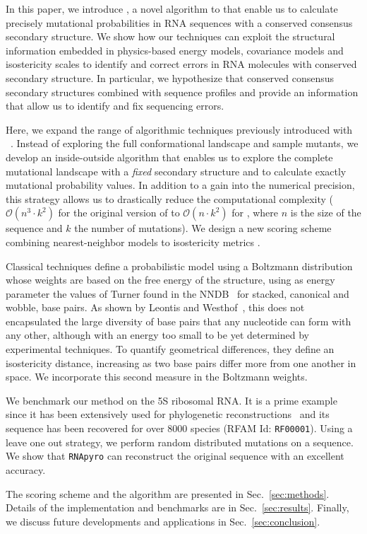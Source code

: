 In this paper, we introduce \RNApyro, a novel algorithm to that enable us to calculate precisely mutational probabilities in RNA sequences with a
conserved consensus secondary structure. We show how our techniques can exploit the structural information embedded in physics-based energy models, 
covariance models and isostericity scales to identify and correct errors in RNA molecules with conserved secondary structure. In particular, we hypothesize that 
conserved consensus secondary structures combined with sequence profiles and provide an information that allow us to identify and fix sequencing errors.

Here, we expand the range of algorithmic techniques previously introduced with \RNAmutants~\cite{Waldispuhl2008}.
Instead of exploring the full conformational landscape and sample mutants, we develop an inside-outside algorithm that enables us
to explore the complete mutational landscape with a \emph{fixed} secondary structure and to calculate exactly mutational probability values. In addition
to a gain into the numerical precision, this strategy allows us to drastically reduce the computational complexity ($\mathcal{O}(n^3 \cdot k^2)$ for the
original version of  \RNAmutants to $\mathcal{O}(n \cdot k^2)$ for \RNApyro, where $n$ is the size of the sequence and $k$ the number of mutations).
We design a new scoring scheme combining nearest-neighbor models \cite{Turner2010} to isostericity metrics \cite{Stombaugh2009}.

Classical techniques define a probabilistic model using a Boltzmann distribution 
whose weights are based on the free energy of the structure, using as energy parameter
the values of Turner found in the NNDB~\cite{Turner2010}  for stacked, 
canonical and wobble, base pairs. As shown by Leontis and Westhof~\cite{Leontis2001},
this  does not encapsulated the large diversity of base pairs that any nucleotide
can form with any other, although with an energy too small to be yet determined
by experimental techniques. To quantify geometrical differences, they
 define an isostericity distance, increasing as two base pairs differ 
 more from one another in space. We incorporate this second measure in the Boltzmann weights.
 
We benchmark our method on the 5S ribosomal RNA. It is a prime example since it has been extensively used for phylogenetic
reconstructions~\cite{Hori1987} and its sequence has been recovered for over 8000 species
 (RFAM Id: \texttt{RF00001}).
 Using a leave one out strategy, we perform random distributed mutations on a sequence. We show that
\texttt{RNApyro} can reconstruct the original sequence with an excellent accuracy.

The scoring scheme and the algorithm are presented in Sec.~\ref{sec:methods}.
Details of the implementation and benchmarks are in Sec.~\ref{sec:results}. 
Finally, we discuss future developments and applications in Sec.~\ref{sec:conclusion}.